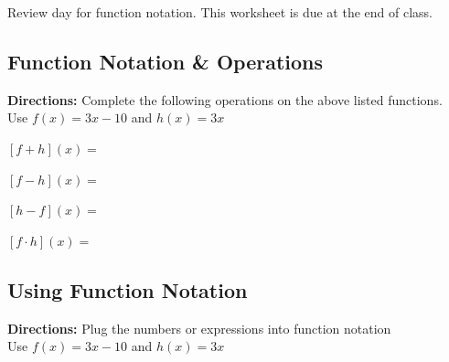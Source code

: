 \documentclass[12pt]{article}
\begin{document}
Review day for function notation. This worksheet is due at the end of class.\\

\subsection{Function Notation \& Operations}



\textbf{Directions:} Complete the following operations on the above listed functions.\\ Use $f(x)=3x-10$ \hspace{.3in} and \hspace{.3in} $h(x)=3x$\\

\begin{enumerate}
\begin{multicols}{2}

	\item $[f+h](x)=$\\
	
	\item $[f-h](x)=$\\
	
	\item $[h-f](x)=$\\
	
	\item $[f \cdot h](x)=$\\
	
	
\end{multicols}
\end{enumerate}

\hrulefill

\subsection{Using Function Notation}

\textbf{Directions:} Plug the numbers or expressions into function notation\\ Use $f(x)=3x-10$ \hspace{.3in} and \hspace{.3in} $h(x)=3x$
\end{document}
